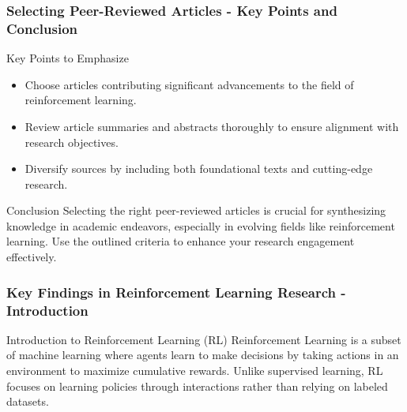 \documentclass[aspectratio=169]{beamer}
\begin{document}
\begin{frame}[fragile]
    \frametitle{Selecting Peer-Reviewed Articles - Key Points and Conclusion}
    \begin{block}{Key Points to Emphasize}
        \begin{itemize}
            \item Choose articles contributing significant advancements to the field of reinforcement learning.
            \item Review article summaries and abstracts thoroughly to ensure alignment with research objectives.
            \item Diversify sources by including both foundational texts and cutting-edge research.
        \end{itemize}
    \end{block}
    
    \begin{block}{Conclusion}
        Selecting the right peer-reviewed articles is crucial for synthesizing knowledge in academic endeavors, especially in evolving fields like reinforcement learning. Use the outlined criteria to enhance your research engagement effectively.
    \end{block}
\end{frame}

\begin{frame}[fragile]
    \frametitle{Key Findings in Reinforcement Learning Research - Introduction}
    \begin{block}{Introduction to Reinforcement Learning (RL)}
        Reinforcement Learning is a subset of machine learning where agents learn to make decisions by taking actions in an environment to maximize cumulative rewards. 
        Unlike supervised learning, RL focuses on learning policies through interactions rather than relying on labeled datasets.
    \end{block}
\end{frame}
\end{document}
